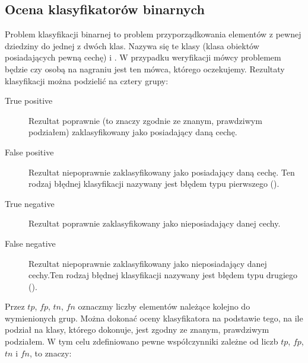 

\subsection{Ocena klasyfikatorów binarnych}

Problem klasyfikacji binarnej to problem przyporządkowania elementów z
pewnej dziedziny do jednej z dwóch klas. Nazywa się te klasy
 (klasa obiektów posiadających pewną cechę) i . 
W przypadku weryfikacji mówcy problemem będzie czy osobą na nagraniu jest ten mówca, którego oczekujemy.
Rezultaty klasyfikacji można podzielić na cztery grupy:

\begin{description}
    \item[True positive] Rezultat poprawnie (to znaczy zgodnie ze znanym, prawdziwym podziałem) zaklasyfikowany jako posiadający daną cechę.
    \item[False positive] Rezultat niepoprawnie zaklasyfikowany jako posiadający daną cechę. Ten rodzaj błędnej klasyfikacji nazywany jest błędem typu pierwszego ().
    \item[True negative] Rezultat poprawnie zaklasyfikowany jako nieposiadający danej cechy.
    \item[False negative] Rezultat niepoprawnie zaklasyfikowany jako nieposiadający danej cechy.Ten rodzaj błędnej klasyfikacji nazywany jest błędem typu drugiego ().
\end{description}

Przez $tp$, $fp$, $tn$, $fn$ oznaczmy liczby elementów należące kolejno do wymienionych grup.
Można dokonać oceny klasyfikatora na podstawie tego, na ile podział na klasy, którego dokonuje,
jest zgodny ze znanym, prawdziwym podziałem. W tym celu zdefiniowano pewne współczynniki zależne
od liczb $tp$, $fp$, $tn$ i $fn$, to znaczy:

